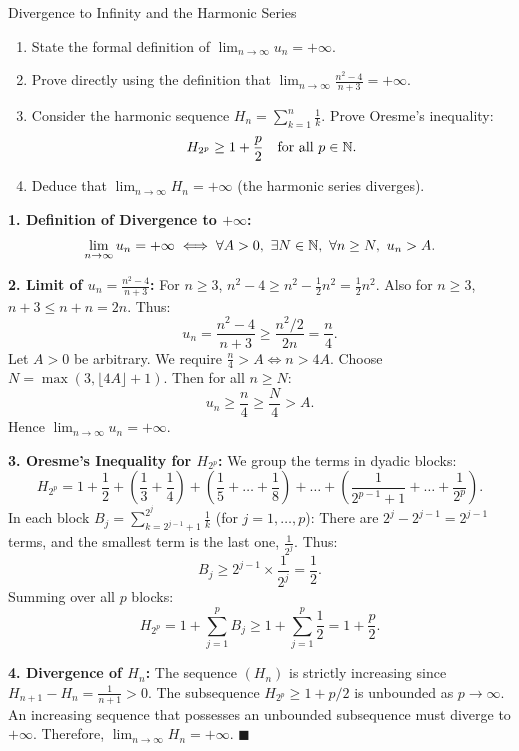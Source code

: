 \begin{exercise}{Divergence to Infinity and the Harmonic Series}
\begin{enumerate}[leftmargin=1.5em,itemsep=2pt]
  \item State the formal definition of $\lim_{n \to \infty} u_n = +\infty$.
  \item Prove directly using the definition that $\lim_{n \to \infty} \frac{n^2 - 4}{n + 3} = +\infty$.
  \item Consider the harmonic sequence $H_n = \sum_{k=1}^n \frac{1}{k}$. Prove Oresme's inequality:
  \[
  H_{2^p} \ge 1 + \frac{p}{2} \quad \text{for all } p \in \mathbb{N}.
  \]
  \item Deduce that $\lim_{n \to \infty} H_n = +\infty$ (the harmonic series diverges).
\end{enumerate}
\end{exercise}

\begin{tabletworkspace}[5.0cm]
\end{tabletworkspace}

\begin{solution}
\textbf{1. Definition of Divergence to $+\infty$:}
\[
\lim_{n \to \infty} u_n = +\infty \iff \forall A > 0,\ \exists N \in \mathbb{N},\ \forall n \ge N,\ u_n > A.
\]

\textbf{2. Limit of $u_n = \frac{n^2 - 4}{n + 3}$:}
For $n \ge 3$, $n^2 - 4 \ge n^2 - \frac{1}{2}n^2 = \frac{1}{2}n^2$.
Also for $n \ge 3$, $n + 3 \le n + n = 2n$.
Thus:
\[
u_n = \frac{n^2 - 4}{n + 3} \ge \frac{n^2 / 2}{2n} = \frac{n}{4}.
\]
Let $A > 0$ be arbitrary. We require $\frac{n}{4} > A \iff n > 4A$.
Choose $N = \max(3, \lfloor 4A \rfloor + 1)$.
Then for all $n \ge N$:
\[
u_n \ge \frac{n}{4} \ge \frac{N}{4} > A.
\]
Hence $\lim_{n \to \infty} u_n = +\infty$.

\textbf{3. Oresme's Inequality for $H_{2^p}$:}
We group the terms in dyadic blocks:
\[
H_{2^p} = 1 + \frac{1}{2} + \left( \frac{1}{3} + \frac{1}{4} \right) + \left( \frac{1}{5} + \dots + \frac{1}{8} \right) + \dots + \left( \frac{1}{2^{p-1} + 1} + \dots + \frac{1}{2^p} \right).
\]
In each block $B_j = \sum_{k=2^{j-1}+1}^{2^j} \frac{1}{k}$ (for $j = 1, \dots, p$):
There are $2^j - 2^{j-1} = 2^{j-1}$ terms, and the smallest term is the last one, $\frac{1}{2^j}$.
Thus:
\[
B_j \ge 2^{j-1} \times \frac{1}{2^j} = \frac{1}{2}.
\]
Summing over all $p$ blocks:
\[
H_{2^p} = 1 + \sum_{j=1}^p B_j \ge 1 + \sum_{j=1}^p \frac{1}{2} = 1 + \frac{p}{2}.
\]

\textbf{4. Divergence of $H_n$:}
The sequence $(H_n)$ is strictly increasing since $H_{n+1} - H_n = \frac{1}{n+1} > 0$.
The subsequence $H_{2^p} \ge 1 + p/2$ is unbounded as $p \to \infty$.
An increasing sequence that possesses an unbounded subsequence must diverge to $+\infty$.
Therefore, $\lim_{n \to \infty} H_n = +\infty$. \hfill $\blacksquare$
\end{solution}


